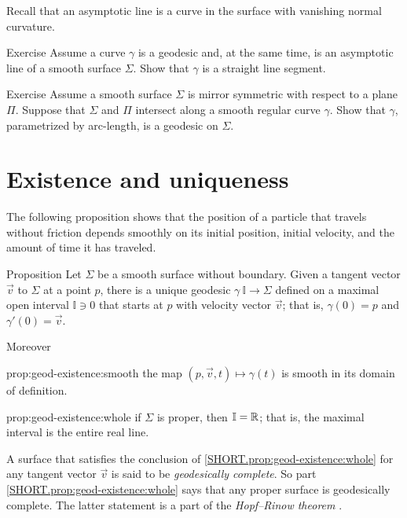 Recall that an asymptotic line is a curve in the surface with vanishing normal curvature.

\begin{thm}{Exercise}\label{ex:asymptotic-geodesic}
Assume a curve $\gamma$ is a geodesic and, at the same time, is an asymptotic line of a smooth surface $\Sigma$.
Show that $\gamma$ is a straight line segment.
\end{thm}


\begin{thm}{Exercise}\label{ex:reflection-geodesic}
Assume a smooth surface $\Sigma$ is mirror symmetric with respect to  a plane $\Pi$.
Suppose that $\Sigma$ and $\Pi$ intersect along a smooth regular curve $\gamma$.
Show that $\gamma$, parametrized by arc-length, is a geodesic on $\Sigma$.
\end{thm}



\section{Existence and uniqueness}

The following proposition  shows that the position of a particle that travels without friction depends smoothly on its initial position, initial velocity, and the amount of time it has traveled. 



\begin{thm}{Proposition}\label{prop:geod-existence} 
Let $\Sigma$ be  a smooth surface without boundary.
Given a tangent vector ${\vec v}$ to $\Sigma$ at a point $p$,
there is a unique geodesic $\gamma\:\mathbb{I}\to \Sigma$ defined on a maximal open interval $\mathbb{I}\ni 0$ that starts at $p$ with velocity vector ${\vec v}$;
that is, $\gamma(0)=p$ and $\gamma'(0)={\vec v}$.

Moreover
\begin{subthm}{prop:geod-existence:smooth} the map $(p,{\vec v},t)\mapsto \gamma(t)$ is smooth in its domain of definition.
\end{subthm}

\begin{subthm}{prop:geod-existence:whole} if $\Sigma$ is proper, then $\mathbb{I}=\mathbb{R}$; that is, the maximal interval is the entire real line.
\end{subthm}

\end{thm}

A surface that satisfies the conclusion of \ref{SHORT.prop:geod-existence:whole} for any tangent vector ${\vec v}$ is said to be \emph{geodesically complete}.
So part \ref{SHORT.prop:geod-existence:whole} says that any proper surface is geodesically complete.
The latter statement is a part of the \emph{Hopf--Rinow theorem} \cite{hopf-rinow}.%

